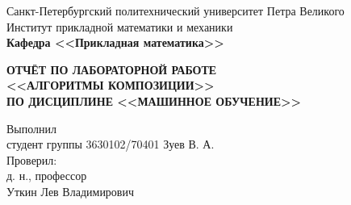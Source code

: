 \documentclass[main.tex]{subfiles}
\begin{document}
\begin{titlepage}
\begin{center}
	\begin{large}
		Санкт-Петербургский политехнический университет Петра Великого\\
		Институт прикладной математики и механики\\
		\textbf{Кафедра <<Прикладная математика>>}\\
	\end{large}
	\vfill
	\Large{\textbf{ОТЧЁТ ПО ЛАБОРАТОРНОЙ РАБОТЕ\\
	<<АЛГОРИТМЫ КОМПОЗИЦИИ>>\\
	ПО ДИСЦИПЛИНЕ <<МАШИННОЕ ОБУЧЕНИЕ>>}}
\end{center}
\vfill
\flushleft
Выполнил\\
студент группы 3630102/70401
\flushright
Зуев В. А.\\
\flushleft
Проверил:\\
д. н., профессор\\
\flushright
Уткин Лев Владимирович\\
\vfill
{}
\end{titlepage}
\end{document}
